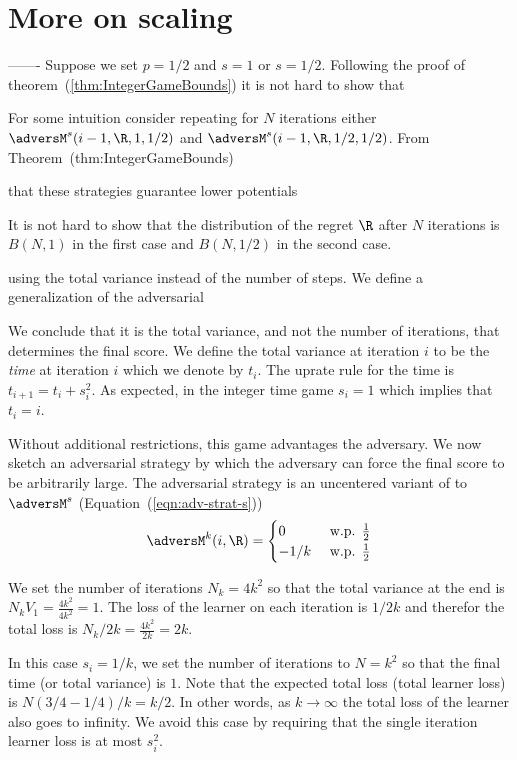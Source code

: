 \section{More on scaling}

-------
Suppose we set $p=1/2$ and $s=1$ or $s=1/2$.
Following the proof of
theorem~(\ref{thm:IntegerGameBounds}) it is not hard to show that


For some intuition consider repeating for $N$ iterations either  
$\adversM^s(i-1,\R,1,1/2)$ and $\adversM^s(i-1,\R,1/2,1/2)$.
From Theorem~({thm:IntegerGameBounds}) 


that these strategies
guarantee lower potentials 

It is not hard
to show that the distribution of the regret $\R$  after $N$ iterations
is $B(N,1)$ in the first case and $B(N,1/2)$ in the second
case. 



using the total variance instead of
the number of steps. We define a generalization of the adversarial


We conclude that it is the total variance, and not the number of
iterations, that determines the final score. We define the total
variance at iteration $i$ to be the {\em time} at iteration $i$ which
we denote by $t_i$. The uprate rule for the time is $t_{i+1}=t_i+s_i^2$. 
As expected, in the integer time game $s_i=1$ which
implies that $t_i = i$.

Without additional restrictions, this game advantages the
adversary. We now sketch an adversarial strategy by which the
adversary can force the final score to be arbitrarily large.
The adversarial strategy is an uncentered variant of
to $\adversM^s$ (Equation~(\ref{eqn:adv-strat-s}))
\begin{equation} \label{eqn:adv-strat-k}
  \adversM^k(i,\R) =
  \begin{cases}
    0 & \mbox{ w.p. } \frac{1}{2}\\
    -1/k  & \mbox{ w.p. } \frac{1}{2}\\
  \end{cases}
\end{equation}

We set the number of iterations $N_k=4k^2$ so that the total variance
at the end is $N_k V_1= \frac{4k^2}{4k^2}=1$. The loss of the learner
on each iteration is $1/2k$ and therefor the total loss is $N_k/2k =
\frac{4k^2}{2k} = 2k$.


In this case $s_i=1/k$, we set the number of iterations to $N=k^2$ so
that the final time (or total variance) is $1$. Note that the expected
total loss (total learner loss) is $N (3/4-1/4)/k = k/2$. In other words, as $k \to \infty$
the total loss of the learner also goes to infinity. We avoid this
case by requiring that the single iteration learner loss is at most
$s_i^2$.


